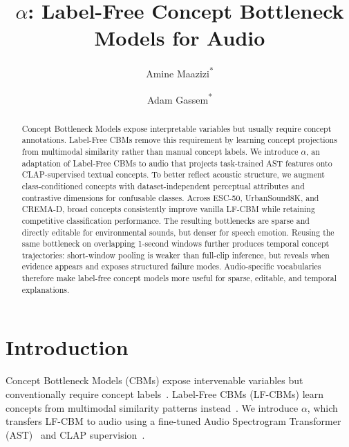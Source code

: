 \documentclass[runningheads]{llncs}
\newcommand{\method}{\ensuremath{\alpha}\text{-CBM}}
\begin{document}
\title{\method: Label-Free Concept Bottleneck Models for Audio}
\titlerunning{\method}
\author{Amine Maazizi\textsuperscript{*} \and
Adam Gassem\textsuperscript{*}}
\maketitle


\begin{abstract}
Concept Bottleneck Models expose interpretable variables but usually require concept annotations. Label-Free CBMs remove this requirement by learning concept projections from multimodal similarity rather than manual concept labels. We introduce \method, an adaptation of Label-Free CBMs to audio that projects task-trained AST features onto CLAP-supervised textual concepts. To better reflect acoustic structure, we augment class-conditioned concepts with dataset-independent perceptual attributes and contrastive dimensions for confusable classes. Across ESC-50, UrbanSound8K, and CREMA-D, broad concepts consistently improve vanilla LF-CBM while retaining competitive classification performance. The resulting bottlenecks are sparse and directly editable for environmental sounds, but denser for speech emotion. Reusing the same bottleneck on overlapping 1-second windows further produces temporal concept trajectories: short-window pooling is weaker than full-clip inference, but reveals when evidence appears and exposes structured failure modes. Audio-specific vocabularies therefore make label-free concept models more useful for sparse, editable, and temporal explanations.
\end{abstract}

\section{Introduction}
Concept Bottleneck Models (CBMs) expose intervenable variables but conventionally require concept labels~\cite{koh2020concept}. Label-Free CBMs (LF-CBMs) learn concepts from multimodal similarity patterns instead~\cite{oikarinen2023labelfree}. We introduce \method, which transfers LF-CBM to audio using a fine-tuned Audio Spectrogram Transformer (AST)~\cite{gong2021ast} and CLAP supervision~\cite{elizalde2023clap}.
\end{document}
